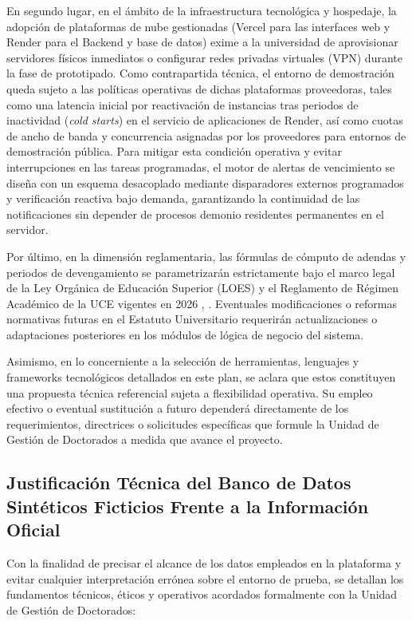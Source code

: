En segundo lugar, en el ámbito de la infraestructura tecnológica y hospedaje, la adopción de plataformas de nube gestionadas (Vercel para las interfaces web y Render para el Backend y base de datos) exime a la universidad de aprovisionar servidores físicos inmediatos o configurar redes privadas virtuales (VPN) durante la fase de prototipado. Como contrapartida técnica, el entorno de demostración queda sujeto a las políticas operativas de dichas plataformas proveedoras, tales como una latencia inicial por reactivación de instancias tras periodos de inactividad (\textit{cold starts}) en el servicio de aplicaciones de Render, así como cuotas de ancho de banda y concurrencia asignadas por los proveedores para entornos de demostración pública. Para mitigar esta condición operativa y evitar interrupciones en las tareas programadas, el motor de alertas de vencimiento se diseña con un esquema desacoplado mediante disparadores externos programados y verificación reactiva bajo demanda, garantizando la continuidad de las notificaciones sin depender de procesos demonio residentes permanentes en el servidor.

Por último, en la dimensión reglamentaria, las fórmulas de cómputo de adendas y periodos de devengamiento se parametrizarán estrictamente bajo el marco legal de la Ley Orgánica de Educación Superior (LOES) y el Reglamento de Régimen Académico de la UCE vigentes en 2026 \cite{loes}, \cite{reglamento_uce}. Eventuales modificaciones o reformas normativas futuras en el Estatuto Universitario requerirán actualizaciones o adaptaciones posteriores en los módulos de lógica de negocio del sistema.

Asimismo, en lo concerniente a la selección de herramientas, lenguajes y frameworks tecnológicos detallados en este plan, se aclara que estos constituyen una propuesta técnica referencial sujeta a flexibilidad operativa. Su empleo efectivo o eventual sustitución a futuro dependerá directamente de los requerimientos, directrices o solicitudes específicas que formule la Unidad de Gestión de Doctorados a medida que avance el proyecto.

\subsection{Justificación Técnica del Banco de Datos Sintéticos Ficticios Frente a la Información Oficial}

Con la finalidad de precisar el alcance de los datos empleados en la plataforma y evitar cualquier interpretación errónea sobre el entorno de prueba, se detallan los fundamentos técnicos, éticos y operativos acordados formalmente con la Unidad de Gestión de Doctorados:

